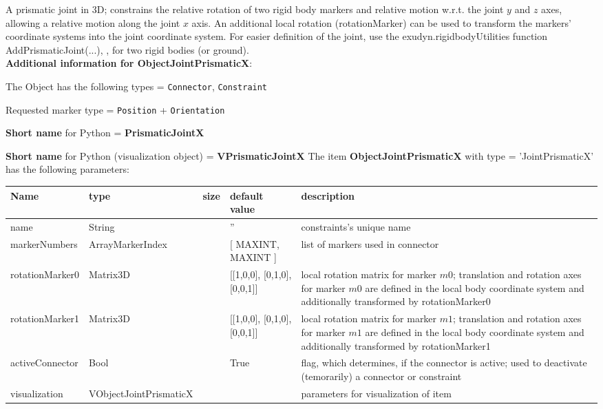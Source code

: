 \label{sec:item:ObjectJointPrismaticX}
A prismatic joint in 3D; constrains the relative rotation of two rigid body markers and relative motion w.r.t. the joint $y$ and $z$ axes, allowing a relative motion along the joint $x$ axis. An additional local rotation (rotationMarker) can be used to transform the markers' coordinate systems into the joint coordinate system. For easier definition of the joint, use the exudyn.rigidbodyUtilities function AddPrismaticJoint(...), , for two rigid bodies (or ground). 
 \vspace{12pt}
 \\{\bf Additional information for ObjectJointPrismaticX}:
\bi
  \item The Object has the following types = \texttt{Connector}, \texttt{Constraint}
  \item Requested marker type = \texttt{Position} + \texttt{Orientation}
  \item {\bf Short name} for Python = {\bf PrismaticJointX}  \item {\bf Short name} for Python (visualization object) = {\bf VPrismaticJointX}\ei
\vspace{12pt} \noindent The item {\bf ObjectJointPrismaticX} with type = 'JointPrismaticX' has the following parameters:\vspace{-1cm}\\ 
\begin{center}
  \footnotesize
  \begin{longtable}{| p{4.5cm} | p{2.5cm} | p{0.5cm} | p{2.5cm} | p{6cm} |}
    \hline
    \bf Name & \bf type & \bf size & \bf default value & \bf description \\ \hline
    name &     String &      &     '' &     constraints's unique name\\ \hline
    markerNumbers &     ArrayMarkerIndex &     \tabnewline 2 &     [ MAXINT, MAXINT ] &     list of markers used in connector\\ \hline
    rotationMarker0 &     Matrix3D &      &     [[1,0,0], [0,1,0], [0,0,1]] &     local rotation matrix for marker $m0$; translation and rotation axes for marker $m0$ are defined in the local body coordinate system and additionally transformed by rotationMarker0\\ \hline
    rotationMarker1 &     Matrix3D &      &     [[1,0,0], [0,1,0], [0,0,1]] &     local rotation matrix for marker $m1$; translation and rotation axes for marker $m1$ are defined in the local body coordinate system and additionally transformed by rotationMarker1\\ \hline
    activeConnector &     Bool &      &     True &     flag, which determines, if the connector is active; used to deactivate (temorarily) a connector or constraint\\ \hline
    visualization & VObjectJointPrismaticX & & & parameters for visualization of item \\ \hline
	  \end{longtable}
	\end{center}
